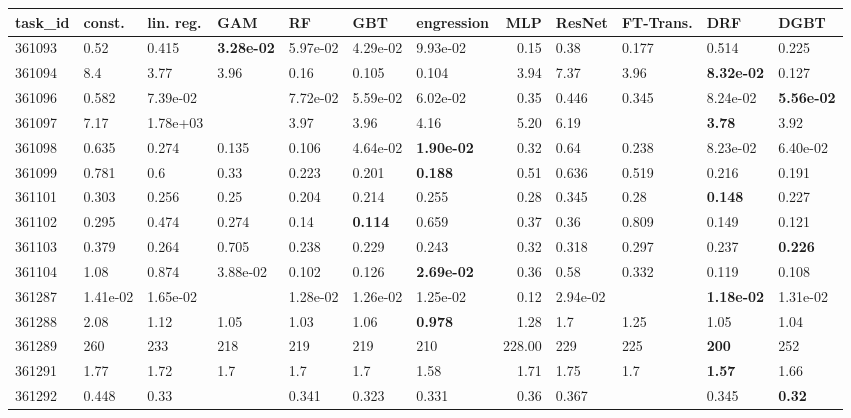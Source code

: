 \begin{table}[ht!]
\centering
\begingroup\footnotesize
\begin{tabular}{lllllllrllll}
  \hline
\hline
task\_id & const. & lin. reg. & GAM & RF & GBT & engression & MLP & ResNet & FT-Trans. & DRF & DGBT \\ 
  \hline
361093 & 0.52 & 0.415 & \textbf{3.28e-02} & 5.97e-02 & 4.29e-02 & 9.93e-02 & 0.15 & 0.38 & 0.177 & 0.514 & 0.225 \\ 
  361094 & 8.4 & 3.77 & 3.96 & 0.16 & 0.105 & 0.104 & 3.94 & 7.37 & 3.96 & \textbf{8.32e-02} & 0.127 \\ 
  361096 & 0.582 & 7.39e-02 &  & 7.72e-02 & 5.59e-02 & 6.02e-02 & 0.35 & 0.446 & 0.345 & 8.24e-02 & \textbf{5.56e-02} \\ 
  361097 & 7.17 & 1.78e+03 &  & 3.97 & 3.96 & 4.16 & 5.20 & 6.19 &  & \textbf{3.78} & 3.92 \\ 
  361098 & 0.635 & 0.274 & 0.135 & 0.106 & 4.64e-02 & \textbf{1.90e-02} & 0.32 & 0.64 & 0.238 & 8.23e-02 & 6.40e-02 \\ 
  361099 & 0.781 & 0.6 & 0.33 & 0.223 & 0.201 & \textbf{0.188} & 0.51 & 0.636 & 0.519 & 0.216 & 0.191 \\ 
  361101 & 0.303 & 0.256 & 0.25 & 0.204 & 0.214 & 0.255 & 0.28 & 0.345 & 0.28 & \textbf{0.148} & 0.227 \\ 
  361102 & 0.295 & 0.474 & 0.274 & 0.14 & \textbf{0.114} & 0.659 & 0.37 & 0.36 & 0.809 & 0.149 & 0.121 \\ 
  361103 & 0.379 & 0.264 & 0.705 & 0.238 & 0.229 & 0.243 & 0.32 & 0.318 & 0.297 & 0.237 & \textbf{0.226} \\ 
  361104 & 1.08 & 0.874 & 3.88e-02 & 0.102 & 0.126 & \textbf{2.69e-02} & 0.36 & 0.58 & 0.332 & 0.119 & 0.108 \\ 
  361287 & 1.41e-02 & 1.65e-02 &  & 1.28e-02 & 1.26e-02 & 1.25e-02 & 0.12 & 2.94e-02 &  & \textbf{1.18e-02} & 1.31e-02 \\ 
  361288 & 2.08 & 1.12 & 1.05 & 1.03 & 1.06 & \textbf{0.978} & 1.28 & 1.7 & 1.25 & 1.05 & 1.04 \\ 
  361289 & 260 & 233 & 218 & 219 & 219 & 210 & 228.00 & 229 & 225 & \textbf{200} & 252 \\ 
  361291 & 1.77 & 1.72 & 1.7 & 1.7 & 1.7 & 1.58 & 1.71 & 1.75 & 1.7 & \textbf{1.57} & 1.66 \\ 
  361292 & 0.448 & 0.33 &  & 0.341 & 0.323 & 0.331 & 0.36 & 0.367 &  & 0.345 & \textbf{0.32} \\ 

\end{tabular}
\end{table}
